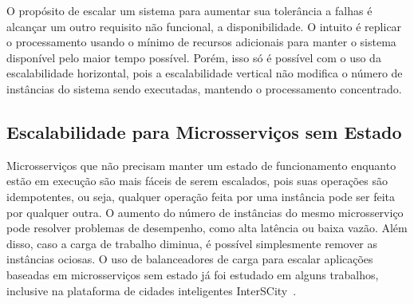O propósito de escalar um sistema para aumentar sua tolerância a falhas é alcançar um outro requisito não funcional, a disponibilidade. O intuito é replicar o processamento usando o mínimo de recursos adicionais para manter o sistema disponível pelo maior tempo possível. Porém, isso só é possível com o uso da escalabilidade horizontal, pois a escalabilidade vertical não modifica o número de instâncias do sistema sendo executadas, mantendo o processamento concentrado.



\subsection{Escalabilidade para Microsserviços sem Estado}
\label{sec:stateless}


Microsserviços que não precisam manter um estado de funcionamento enquanto estão em execução são mais fáceis de serem escalados, pois suas operações são idempotentes, ou seja, qualquer operação feita por uma instância pode ser feita por qualquer outra. O aumento do número de instâncias do mesmo microsserviço pode resolver problemas de desempenho, como alta latência ou baixa vazão. Além disso, caso a carga de trabalho diminua, é possível simplesmente remover as instâncias ociosas. O uso de balanceadores de carga para escalar aplicações baseadas em microsserviços sem estado já foi estudado em alguns trabalhos, inclusive na plataforma de cidades inteligentes InterSCity~\citep{smartgreens17,7958492,7333476}.
  


